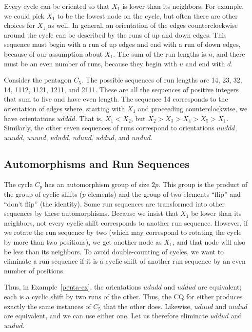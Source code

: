 Every cycle can be oriented so that $X_1$ is lower than its neighbors.  For example, we could pick $X_1$ to be the lowest node on the cycle, but often there are other choices for $X_1$ as well.  In general, an orientation of the edges counterclockwise around the cycle can be described by the runs of up and down edges.  This sequence must begin with a run of up edges and end with a run of down edges, because of our assumption about $X_1$.  The sum of the run lengths is $n$, and there must be an even number of runs, because they begin with $u$ and end with $d$.

\begin{example}
\label{penta-ex}
Consider the pentagon $C_5$.  The possible sequences of run lengths are 14, 23, 32, 14, 1112, 1121, 1211, and 2111.  These are all the sequences of positive integers that sum to five and have even length.  The sequence 14 corresponds to the orientation of edges where, starting with $X_1$ and proceeding counterclockwise, we have orientations $udddd$.  That is, $X_1<X_2$, but $X_2>X_3>X_4>X_5>X_1$.  Similarly, the other seven sequences of runs correspond to orientations $uuddd$, $uuudd$, $uuuud$, $ududd$, $uduud$, $uddud$, and $uudud$.
\end{example}

\subsection{Automorphisms and Run Sequences}
\label{auto-run-subsect}

The cycle $C_p$ has an automorphism group of size $2p$.  This group is the product of the group of cyclic shifts ($p$ elements) and the group of two elements ``flip'' and ``don't flip'' (the identity).  Some run sequences are transformed into other sequences by these automorphisms.
Because we insist that $X_1$ be lower than its neighbors, not every cyclic shift corresponds to another run sequence.  However, if we rotate the run sequence by two (which may correspond to rotating the cycle by more than two positions), we get another node as $X_1$, and that node will also be less than its neighbors.  To avoid double-counting of cycles, we want to eliminate a run sequence if it is a cyclic shift of another run sequence by an even number of positions.


\begin{example}
\label{penta2-ex}
Thus, in Example~\ref{penta-ex}, the orientations $ududd$ and $uddud$ are equivalent; each is a cyclic shift by two runs of the other.  Thus, the CQ for either produces exactly the same instances of $C_5$ that the other does.  Likewise, $uduud$ and $uudud$ are equivalent, and we can use either one.  Let us therefore eliminate $uddud$ and $uudud$.
\end{example}

